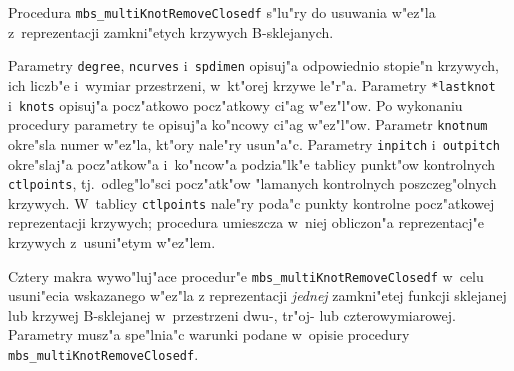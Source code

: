 \vspace{\bigskipamount}
\begin{sloppypar}
Procedura \texttt{mbs\_multiKnotRemoveClosedf} s"lu"ry do
usuwania w"ez"la z~reprezentacji zamkni"etych krzywych B-sklejanych.
\end{sloppypar}

Parametry \texttt{degree}, \texttt{ncurves} i~\texttt{spdimen} opisuj"a
odpowiednio stopie"n krzywych, ich liczb"e i~wymiar przestrzeni, w~kt"orej
krzywe le"r"a. Parametry \texttt{*lastknot} i~\texttt{knots} opisuj"a
pocz"atkowo pocz"atkowy ci"ag w"ez"l"ow. Po wykonaniu procedury parametry te
opisuj"a ko"ncowy ci"ag w"ez"l"ow.
Parametr \texttt{knotnum} okre"sla numer w"ez"la, kt"ory nale"ry usun"a"c.
Parametry \texttt{inpitch} i~\texttt{outpitch} okre"slaj"a pocz"atkow"a
i~ko"ncow"a podzia"lk"e tablicy punkt"ow kontrolnych
\texttt{ctlpoints}, tj.\ odleg"lo"sci pocz"atk"ow "lamanych
kontrolnych poszczeg"olnych krzywych. W~tablicy \texttt{ctlpoints} nale"ry
poda"c punkty kontrolne pocz"atkowej reprezentacji krzywych; procedura
umieszcza w~niej obliczon"a reprezentacj"e krzywych z~usuni"etym w"ez"lem.

\vspace{\bigskipamount}
Cztery makra wywo"luj"ace procedur"e \texttt{mbs\_multiKnotRemoveClosedf}
w~celu usuni"ecia wskazanego w"ez"la z reprezentacji \emph{jednej}
zamkni"etej funkcji sklejanej lub krzywej B-sklejanej w~przestrzeni
dwu-, tr"oj- lub czterowymiarowej. Parametry musz"a spe"lnia"c warunki
podane w~opisie procedury \texttt{mbs\_multiKnotRemoveClosedf}.


